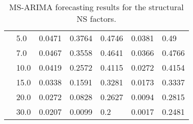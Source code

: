 \begin{table}[htbp]
\begin{tabular}{|l|l|l|l|l|l|l|}
                        &5.0&0.0471&0.3764&0.4746&0.0381&0.49\\ \cline{2-7}
                        &7.0&0.0467&0.3558&0.4641&0.0366&0.4766\\ \cline{2-7}
                        &10.0&0.0419&0.2572&0.4115&0.0272&0.4154\\ \cline{2-7}
                        &15.0&0.0338&0.1591&0.3281&0.0173&0.3337\\ \cline{2-7}
                        &20.0&0.0272&0.0828&0.2627&0.0094&0.2815\\ \cline{2-7}
                        &30.0&0.0207&0.0099&0.2&0.0017&0.2481\\ \hline

        \end{tabular}
        \caption{MS-ARIMA forecasting results for the structural NS factors.}
        \label{tab:structuralARIMAX}
    \end{table}

